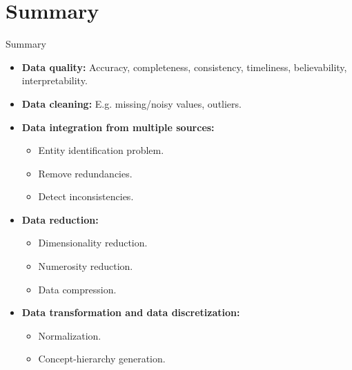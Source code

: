 \section{Summary}

\begin{frame}{Summary}
	\begin{itemize}
		\item \textbf{Data quality:} Accuracy, completeness, consistency,
		      timeliness, believability, interpretability.
		\item \textbf{Data cleaning:} E.g. missing/noisy values, outliers.
		\item \textbf{Data integration from multiple sources:}
		      \begin{itemize}
			      \item Entity identification problem.
			      \item Remove redundancies.
			      \item Detect inconsistencies.
		      \end{itemize}
		\item \textbf{Data reduction:}
		      \begin{itemize}
			      \item Dimensionality reduction.
			      \item Numerosity reduction.
			      \item Data compression.
		      \end{itemize}
		\item \textbf{Data transformation and data discretization:}
		      \begin{itemize}
			      \item Normalization.
			      \item Concept-hierarchy generation.
		      \end{itemize}
	\end{itemize}
\end{frame}
